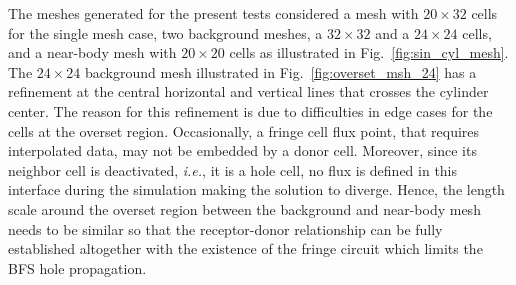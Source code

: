 The meshes generated for the present tests considered a mesh with $20 \times 32$ cells for the single mesh case, two background meshes, a $32 \times 32$ and a $24 \times 24$ cells, and a near-body mesh with $20 \times 20$ cells as illustrated in Fig.\ \ref{fig:sin_cyl_mesh}.  The $24 \times 24$ background mesh illustrated in Fig.\ \ref{fig:overset_msh_24} has a refinement at the central horizontal and vertical lines that crosses the cylinder center. The reason for this refinement is due to difficulties in edge cases for the cells at the overset region. Occasionally, a fringe cell flux point, that requires interpolated data, may not be embedded by a donor cell. Moreover, since its neighbor cell is deactivated, {\em i.e.}, it is a hole cell, no flux is defined in this interface during the simulation making the solution to diverge. Hence, the length scale around the overset region between the background and near-body mesh needs to be similar so that the receptor-donor relationship can be fully established altogether with the existence of the fringe circuit which limits the BFS hole propagation.
%
